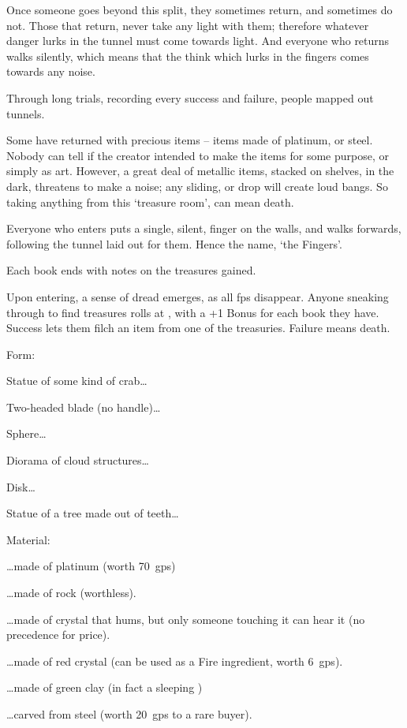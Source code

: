 \begin{multicols}{2}
\begin{exampletext}
  Once someone goes beyond this split, they sometimes return, and sometimes do not.
  Those that return, never take any light with them; therefore whatever danger lurks in the tunnel must come towards light.
  And everyone who returns walks silently, which means that the think which lurks in the fingers comes towards any noise.

  Through long trials, recording every success and failure, people mapped out tunnels.

  Some have returned with precious items -- items made of platinum, or steel.
  Nobody can tell if the creator intended to make the items for some purpose, or simply as art.
  However, a great deal of metallic items, stacked on shelves, in the dark, threatens to make a noise; any sliding, or drop will create loud bangs.
  So taking anything from this `treasure room', can mean death.

  Everyone who enters puts a single, silent, finger on the walls, and walks forwards, following the tunnel laid out for them.
  Hence the name, `the Fingers'.
\end{exampletext}

Each book ends with notes on the treasures gained.

Upon entering, a sense of dread emerges, as all \glspl{fp} disappear.
Anyone sneaking through to find treasures rolls  at \tn[12], with a +1 Bonus for each book they have.
Success lets them filch an item from one of the treasuries.
Failure means death.

Form:

\begin{dlist}
  \item
  Statue of some kind of crab\ldots
  \item
  Two-headed blade (no handle)\ldots
  \item
  Sphere\ldots
  \item
  Diorama of cloud structures\ldots
  \item
  Disk\ldots
  \item
  Statue of a tree made out of teeth\ldots
\end{dlist}

Material:

\begin{dlist}
  \item
  \ldots made of platinum (worth 70~\glspl{gp})
  \item
  \ldots made of rock (worthless).
  \item
  \ldots made of crystal that hums, but only someone touching it can hear it (no precedence for price).
  \item
  \ldots made of red crystal (can be used as a Fire \gls{ingredient}, worth 6~\glspl{gp}).
  \item
  \ldots made of green clay (in fact a sleeping \superWierdzi)
  \item
  \ldots carved from steel (worth 20~\glspl{gp} to a rare buyer).
\end{dlist}

\end{multicols}


